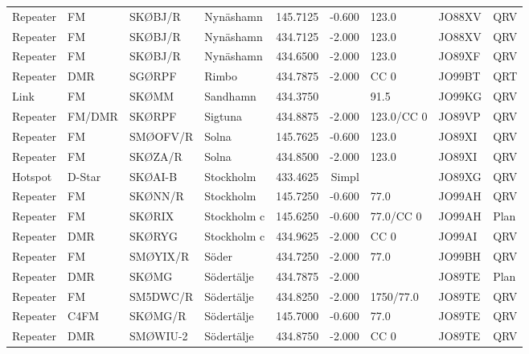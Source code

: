 \begin{longtable}{llllrrlll}
Repeater & FM          & SKØBJ/R  & Nynäshamn   & 145.7125     & -0.600     & 123.0      & JO88XV      & QRV      \\
Repeater & FM          & SKØBJ/R  & Nynäshamn   & 434.7125     & -2.000     & 123.0      & JO88XV      & QRV      \\
Repeater & FM          & SKØBJ/R  & Nynäshamn   & 434.6500     & -2.000     & 123.0      & JO89XF      & QRV      \\
Repeater & DMR         & SGØRPF   & Rimbo       & 434.7875     & -2.000     & CC 0       & JO99BT      & QRT      \\
Link     & FM          & SKØMM    & Sandhamn    & 434.3750     &            & 91.5       & JO99KG      & QRV      \\
Repeater & FM/DMR      & SKØRPF   & Sigtuna     & 434.8875     & -2.000     & 123.0/CC 0 & JO89VP      & QRV      \\
Repeater & FM          & SMØOFV/R & Solna       & 145.7625     & -0.600     & 123.0      & JO89XI      & QRV      \\
Repeater & FM          & SKØZA/R  & Solna       & 434.8500     & -2.000     & 123.0      & JO89XI      & QRV      \\
Hotspot  & D-Star      & SKØAI-B  & Stockholm   & 433.4625     & Simpl      &            & JO89XG      & QRV      \\
Repeater & FM          & SKØNN/R  & Stockholm   & 145.7250     & -0.600     & 77.0       & JO99AH      & QRV      \\
Repeater & FM          & SKØRIX   & Stockholm c & 145.6250     & -0.600     & 77.0/CC 0  & JO99AH      & Plan     \\
Repeater & DMR         & SKØRYG   & Stockholm c & 434.9625     & -2.000     & CC 0       & JO99AI      & QRV      \\
Repeater & FM          & SMØYIX/R & Söder       & 434.7250     & -2.000     & 77.0       & JO99BH      & QRV      \\
Repeater & DMR         & SKØMG    & Södertälje  & 434.7875     & -2.000     &            & JO89TE      & Plan     \\
Repeater & FM          & SM5DWC/R & Södertälje  & 434.8250     & -2.000     & 1750/77.0  & JO89TE      & QRV      \\
Repeater & C4FM        & SKØMG/R  & Södertälje  & 145.7000     & -0.600     & 77.0       & JO89TE      & QRV      \\
Repeater & DMR         & SMØWIU-2 & Södertälje  & 434.8750     & -2.000     & CC 0       & JO89TE      & QRV      \\

\end{longtable}
